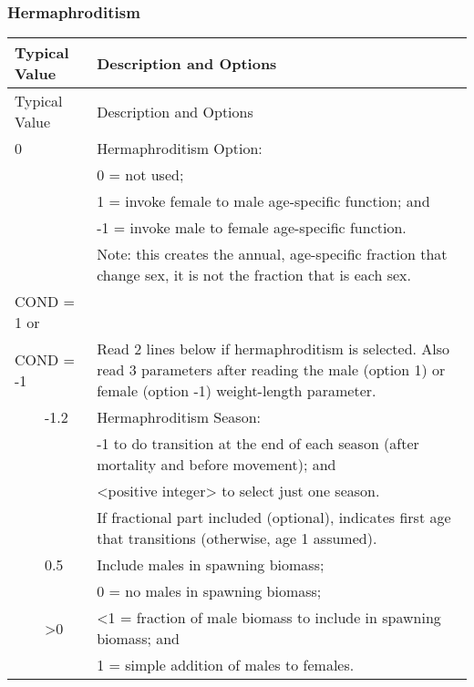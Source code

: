 
\subsubsection{Hermaphroditism}

\begin{longtable}{p{0.5cm} p{2cm} p{13cm}}
	\hline	
	\multicolumn{2}{l}{Typical Value} & Description and Options \Tstrut\Bstrut\\
	\hline
	\endfirsthead

	\hline
	\multicolumn{2}{l}{Typical Value} & Description and Options \Tstrut\Bstrut\\
	\hline
	\endhead
	\hline

	\endfoot
	
	\endlastfoot

	0 & & Hermaphroditism Option: \Tstrut\\
	 &  & 0 = not used; \\
	 &  & 1 = invoke female to male age-specific function; and \\
	 &  & -1 = invoke male to female age-specific function. \\
	 &  & Note: this creates the annual, age-specific fraction that change sex, it is not the fraction that is each sex. \Bstrut\\
	\hline

	\multicolumn{2}{l}{COND = 1 or} \Tstrut & \\
	\multicolumn{2}{l}{COND = -1} & Read 2 lines below if hermaphroditism is selected. Also read 3 parameters after reading the male (option 1) or female (option -1) weight-length parameter. \Bstrut\\
	& -1.2 & Hermaphroditism Season: \\
	&    & -1 to do transition at the end of each season (after mortality and before movement); and \\
	&    & <positive integer> to select just one season. \\
    &	 & If fractional part included (optional), indicates first age that transitions (otherwise, age 1 assumed). \\
	& 0.5 & Include males in spawning biomass; \\
	&    & 0 = no males in spawning biomass; \\
	& >0 & <1 = fraction of male biomass to include in spawning biomass; and \\
	&    & 1 = simple addition of males to females. \Bstrut\\
	\hline
\end{longtable}
\vspace*{-\baselineskip}

